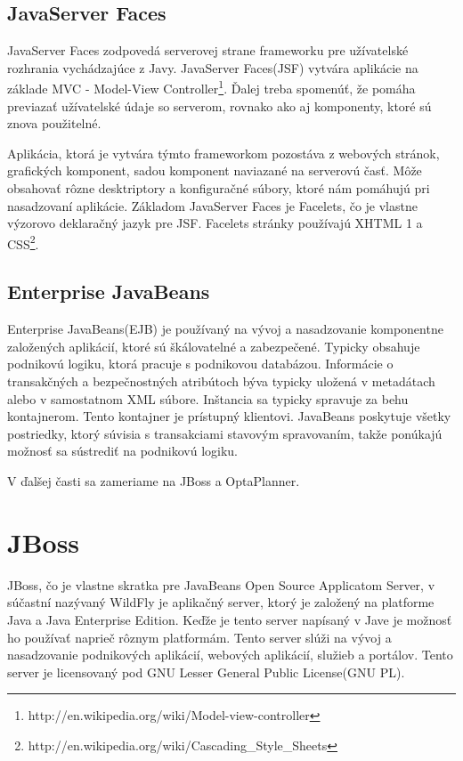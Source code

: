 \section{JavaServer Faces}
JavaServer Faces zodpovedá serverovej strane frameworku pre užívatelské rozhrania vychádzajúce z Javy. JavaServer Faces(JSF) vytvára aplikácie na základe MVC - Model-View Controller\footnote{http://en.wikipedia.org/wiki/Model-view-controller}. Ďalej treba spomenúť, že pomáha previazať užívatelské údaje so serverom, rovnako ako aj komponenty, ktoré sú znova použitelné.

\indent Aplikácia, ktorá je vytvára týmto frameworkom pozostáva z webových stránok, grafických komponent, sadou komponent naviazané na serverovú časť. Môže obsahovať rôzne desktriptory a konfiguračné súbory, ktoré nám pomáhujú pri nasadzovaní aplikácie. Základom JavaServer Faces je Facelets, čo je vlastne výzorovo deklaračný jazyk pre JSF. Facelets stránky používajú XHTML 1 a CSS\footnote{http://en.wikipedia.org/wiki/Cascading\_Style\_Sheets}. 

\section{Enterprise JavaBeans}
Enterprise JavaBeans(EJB) je používaný na vývoj a nasadzovanie komponentne založených aplikácií, ktoré sú škálovatelné a zabezpečené. Typicky obsahuje podnikovú logiku, ktorá pracuje s podnikovou databázou. Informácie o transakčných a bezpečnostných atribútoch býva typicky uložená v metadátach alebo v samostatnom XML súbore. Inštancia sa typicky spravuje za behu kontajnerom. Tento kontajner je prístupný klientovi. JavaBeans poskytuje všetky postriedky, ktorý súvisia s transakciami stavovým spravovaním, takže ponúkajú možnosť sa sústrediť na podnikovú logiku. 

V ďalšej časti sa zameriame na JBoss a OptaPlanner.




\chapter{JBoss} 
JBoss, čo je vlastne skratka pre JavaBeans Open Source Applicatom Server, v súčastní nazývaný WildFly je aplikačný server, ktorý je založený na platforme Java a Java Enterprise Edition.\cite{jbossWeb} Keďže je tento server napísaný v Jave je možnosť ho používať naprieč rôznym platformám. Tento server slúži na vývoj a nasadzovanie podnikových aplikácií, webových aplikácií, služieb a portálov. Tento server je licensovaný pod GNU Lesser General Public License(GNU PL).

